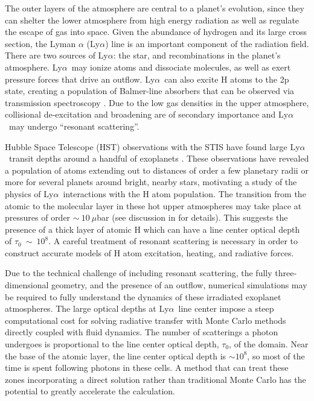 \documentclass{aastex63}
\newcommand\lya{Ly$\alpha$\ }
\begin{document}
The outer layers of the atmosphere are central to a planet's evolution, since they can shelter the lower atmosphere from high energy radiation as well as regulate the escape of gas into space. Given the abundance of hydrogen and its large cross section, the Lyman $\alpha$ (Ly$\alpha$) line is an important component of the radiation field. There are two sources of Ly$\alpha$: the star, and recombinations in the planet's atmosphere. \lya may ionize atoms and dissociate molecules, as well as exert pressure forces that drive an outflow. \lya can also excite H atoms to the 2p state, creating a population of Balmer-line absorbers that can be observed via transmission spectroscopy \citep{2017ApJ...851..150H}. Due to the low gas densities in the upper atmosphere, collisional de-excitation and broadening are of secondary importance and \lya may undergo ``resonant scattering''.

Hubble Space Telescope (HST) observations with the STIS have found large \lya transit depths around a handful of exoplanets \citep{2003Natur.422..143V, 2012A&A...543L...4L, 2012A&A...547A..18E, 2015Natur.522..459E,  2017A&A...597A..26B, 2017A&A...599L...3B, 2017A&A...602A.106B, 2018A&A...620A.147B, 2019AJ....158...50W, 2019EPSC...13.1928L, 2020ApJ...888L..21G,2021arXiv210309864B}. These observations have revealed a population of atoms extending out to distances of order a few planetary radii or more for several planets around bright, nearby stars, motivating a study of the physics of \lya interactions with the H atom population. The transition from the atomic to the molecular layer in these hot upper atmospheres may take place at pressures of order ${\sim}\ 10\ \mu$bar (see discussion in \citet{2017ApJ...851..150H} for details). This suggests the presence of a thick layer of atomic H which can have a line center optical depth of $\tau_0\ {\sim}\ 10^8$. A careful treatment of resonant scattering is necessary in order to construct accurate models of H atom excitation, heating, and radiative forces. 

Due to the technical challenge of including resonant scattering, the fully three-dimensional geometry, and the presence of an outflow, numerical simulations may be required to fully understand the dynamics of these irradiated exoplanet atmospheres. The large optical depths at \lya line center impose a steep computational cost for solving radiative transfer with Monte Carlo methods directly coupled with fluid dynamics. The number of scatterings a photon undergoes is proportional to the line center optical depth, $\tau_0$, of the domain.  Near the base of the atomic layer, the line center optical depth is ${\sim}10^8$, so most of the time is spent following photons in these cells. A method that can treat these zones incorporating a direct solution rather than traditional Monte Carlo has the potential to greatly accelerate the calculation.
\end{document}
